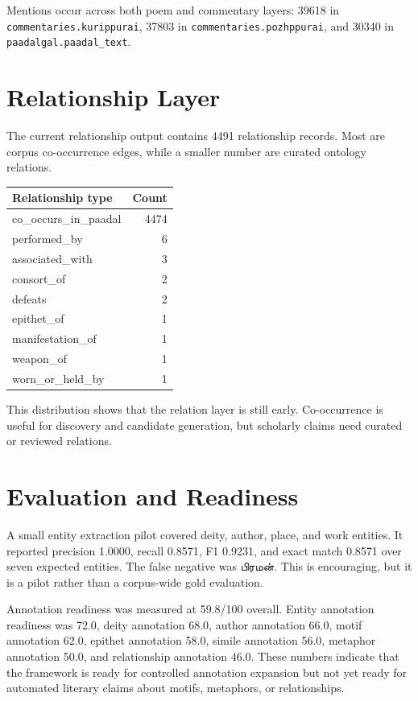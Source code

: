 \documentclass[11pt]{article}
\newcommand{\ta}[1]{{\tamilfont #1}}
\begin{document}
Mentions occur across both poem and commentary layers: 39618 in \texttt{commentaries.kurippurai}, 37803 in \texttt{commentaries.pozhppurai}, and 30340 in \texttt{paadalgal.paadal\_text}.

\section{Relationship Layer}
The current relationship output contains 4491 relationship records. Most are corpus co-occurrence edges, while a smaller number are curated ontology relations.

\begin{longtable}{lr}
\toprule
Relationship type & Count \\
\midrule
co\_occurs\_in\_paadal & 4474 \\
performed\_by & 6 \\
associated\_with & 3 \\
consort\_of & 2 \\
defeats & 2 \\
epithet\_of & 1 \\
manifestation\_of & 1 \\
weapon\_of & 1 \\
worn\_or\_held\_by & 1 \\
\bottomrule
\end{longtable}

This distribution shows that the relation layer is still early. Co-occurrence is useful for discovery and candidate generation, but scholarly claims need curated or reviewed relations.

\section{Evaluation and Readiness}
A small entity extraction pilot covered deity, author, place, and work entities. It reported precision 1.0000, recall 0.8571, F1 0.9231, and exact match 0.8571 over seven expected entities. The false negative was \ta{பிரமன்}. This is encouraging, but it is a pilot rather than a corpus-wide gold evaluation.

Annotation readiness was measured at 59.8/100 overall. Entity annotation readiness was 72.0, deity annotation 68.0, author annotation 66.0, motif annotation 62.0, epithet annotation 58.0, simile annotation 56.0, metaphor annotation 50.0, and relationship annotation 46.0. These numbers indicate that the framework is ready for controlled annotation expansion but not yet ready for automated literary claims about motifs, metaphors, or relationships.
\end{document}
